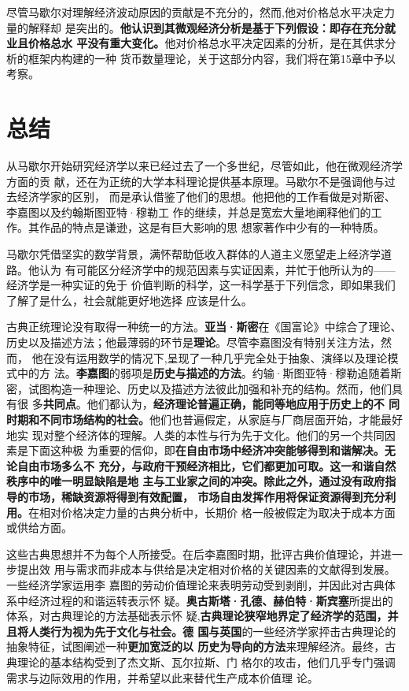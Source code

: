 尽管马歇尔对理解经济波动原因的贡献是不充分的，然而,他对价格总水平决定力量的解释却
是突出的。\textbf{他认识到其微观经济分析是基于下列假设：即存在充分就业且价格总水
  平没有重大变化。}他对价格总水平决定因素的分析，是在其供求分析的框架内构建的一种
货币数量理论，关于这部分内容，我们将在第15章中予以考察。

\section{总结}

从马歇尔开始研究经济学以来已经过去了一个多世纪，尽管如此，他在微观经济学方面的贡
献，还在为正统的大学本科理论提供基本原理。马歇尔不是强调他与过去经济学家的区别，
而是承认借鉴了他们的思想。他把他的工作看做是对斯密、李嘉图以及约翰斯图亚特·穆勒工
作的继续，并总是宽宏大量地阐释他们的工作。其作品的特点是谦逊，这是有巨大影响的思
想家著作中少有的一种特质。

马歇尔凭借坚实的数学背景，满怀帮助低收入群体的人道主义愿望走上经济学道路。他认为
有可能区分经济学中的规范因素与实证因素，并忙于他所认为的——经济学是一种实证的免于
价值判断的科学，这一科学基于下列信念，即如果我们了解了是什么，社会就能更好地选择
应该是什么。

古典正统理论没有取得一种统一的方法。\textbf{亚当·斯密}在《国富论》中综合了理论、
历史以及描述方法；他最薄弱的环节是\textbf{理论}。尽管李嘉图没有特别关注方法，然而，
他在没有运用数学的情况下,呈现了一种几乎完全处于抽象、演绎以及理论模式中的方
法。\textbf{李嘉图}的弱项是\textbf{历史与描述的方法}。约输·斯图亚特·穆勒追随着斯
密，试图构造一种理论、历史以及描述方法彼此加强和补充的结构。然而，他们具有很
多\textbf{共同点}。他们都认为，\textbf{经济理论普遍正确，能同等地应用于历史上的不
  同时期和不同市场结构的社会。}他们也普遍假定，从家庭与厂商层面开始，才能最好地实
现对整个经济体的理解。人类的本性与行为先于文化。他们的另一个共同因素是下面这种极
为重要的信仰，即\textbf{在自由市场中经济冲突能够得到和谐解决。无论自由市场多么不
  充分，与政府干预经济相比，它们都更加可取。这一和谐自然秩序中的唯一明显缺陷是地
  主与工业家之间的冲突。除此之外，通过没有政府指导的市场，稀缺资源将得到有效配置，
  市场自由发挥作用将保证资源得到充分利用。}在相对价格决定力量的古典分析中，长期价
格一般被假定为取决于成本方面或供给方面。

这些古典思想并不为每个人所接受。在后李嘉图时期，批评古典价值理论，并进一步提出效
用与需求而非成本与供给是决定相对价格的关键因素的文献得到发展。一些经济学家运用李
嘉图的劳动价值理论来表明劳动受到剥削，并因此对古典体系中经济过程的和谐运转表示怀
疑。\textbf{奥古斯塔·孔德、赫伯特·斯宾塞}所提出的体系，对古典理论的方法基础表示怀
疑,\textbf{古典理论狭窄地界定了经济学的范围，并且将人类行为视为先于文化与社会。德
  国与英国}的一些经济学家抨击古典理论的抽象特征，试图阐述一种\textbf{更加宽泛的以
  历史为导向的方法}来理解经济。最终，古典理论的基本结构受到了杰文斯、瓦尔拉斯、门
格尔的攻击，他们几乎专门强调需求与边际效用的作用，并希望以此来替代生产成本价值理
论。

